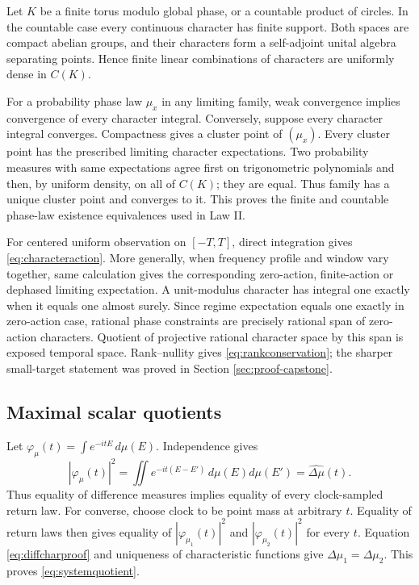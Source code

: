 Let $K$ be a finite torus modulo global phase, or a countable product of
circles.  In the countable case every continuous character has finite
support.  Both spaces are compact abelian groups, and their characters form
a self-adjoint unital algebra separating points.  Hence finite linear
combinations of characters are uniformly dense in $C(K)$.

For a probability phase law $\mu_x$ in any limiting family, weak convergence
implies convergence of every character integral.  Conversely, suppose every
character integral converges.  Compactness gives a cluster point of
$(\mu_x)$.  Every cluster point has the prescribed limiting character
expectations.  Two probability measures with same expectations agree first
on trigonometric polynomials and then, by uniform density, on all of $C(K)$;
they are equal.  Thus family has a unique cluster point and converges to it.
This proves the finite and countable phase-law existence equivalences used in
Law II.

For centered uniform observation on $[-T,T]$, direct integration gives
\eqref{eq:characteraction}.  More generally, when frequency profile and
window vary together, same calculation gives the corresponding
zero-action, finite-action or dephased limiting expectation.  A unit-modulus
character has integral one exactly when it equals one almost surely.  Since
regime expectation equals one exactly in zero-action case, rational phase
constraints are precisely rational span of zero-action characters.  Quotient
of projective rational character space by this span is exposed temporal
space.  Rank--nullity gives \eqref{eq:rankconservation}; the sharper
small-target statement was proved in Section \ref{sec:proof-capstone}.

\subsection{Maximal scalar quotients}

Let $\varphi_\mu(t)=\int e^{-itE}\,d\mu(E)$.  Independence gives
\begin{equation}
 |\varphi_\mu(t)|^2
 =\iint e^{-it(E-E')}\,d\mu(E)d\mu(E')
 =\widehat{\Delta\mu}(t).                             \label{eq:diffcharproof}
\end{equation}
Thus equality of difference measures implies equality of every clock-sampled
return law.  For converse, choose clock to be point mass at arbitrary $t$.
Equality of return laws then gives equality of
$|\varphi_{\mu_1}(t)|^2$ and $|\varphi_{\mu_2}(t)|^2$ for every $t$.
Equation \eqref{eq:diffcharproof} and uniqueness of characteristic functions
give $\Delta\mu_1=\Delta\mu_2$.  This proves
\eqref{eq:systemquotient}.

